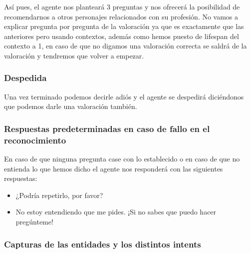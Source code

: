 Así pues, el agente nos planteará 3 preguntas y nos ofrecerá la posibilidad de recomendarnos a otros personajes relacionados con su profesión. No vamos a explicar pregunta por pregunta de la valoración ya que es exactamente que las anteriores pero usando contextos, además como hemos puesto de lifespan del contexto a 1, en caso de que no digamos una valoración correcta se saldrá de la valoración y tendremos que volver a empezar. 

\subsubsection{Despedida}
Una vez terminado podemos decirle adiós y el agente se despedirá diciéndonos que podemos darle una valoración también.


\subsubsection{Respuestas predeterminadas en caso de fallo en el reconocimiento}

En caso de que ninguna pregunta case con lo establecido o en caso de que no entienda lo que hemos dicho el agente nos responderá con las siguientes respuestas:

\begin{itemize}
	\item ¿Podría repetirlo, por favor?
	\item No estoy entendiendo que me pides. ¡Si no sabes que puedo hacer pregúnteme!
\end{itemize}

\subsubsection{Capturas de las entidades y los distintos intents}


